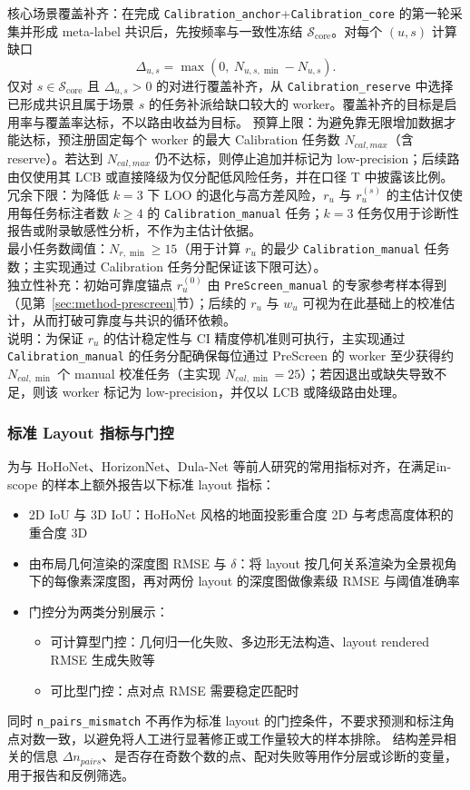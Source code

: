 \noindent 核心场景覆盖补齐：在完成 \texttt{Calibration\_anchor}+\texttt{Calibration\_core} 的第一轮采集并形成 meta-label 共识后，先按频率与一致性冻结 $\mathcal{S}_{\mathrm{core}}$。对每个 $(u,s)$ 计算缺口
\[\Delta_{u,s}=\max\left(0,\ N_{u,s,\min}-N_{u,s}\right).\]
仅对 $s\in\mathcal{S}_{\mathrm{core}}$ 且 $\Delta_{u,s}>0$ 的对进行覆盖补齐，从 \texttt{Calibration\_reserve} 中选择已形成共识且属于场景 $s$ 的任务补派给缺口较大的 worker。覆盖补齐的目标是启用率与覆盖率达标，不以路由收益为目标。
预算上限：为避免靠无限增加数据才能达标，预注册固定每个 worker 的最大 Calibration 任务数 $N_{cal,max}$（含 reserve）。若达到 $N_{cal,max}$ 仍不达标，则停止追加并标记为 low-precision；后续路由仅使用其 LCB 或直接降级为仅分配低风险任务，并在口径 T 中披露该比例。
\\ 冗余下限：为降低 $k=3$ 下 LOO 的退化与高方差风险，$r_u$ 与 $r_u^{\left(s\right)}$ 的主估计仅使用每任务标注者数 $k\geq4$ 的 \texttt{Calibration\_manual} 任务；$k=3$ 任务仅用于诊断性报告或附录敏感性分析，不作为主估计依据。
\\ 最小任务数阈值：$N_{r,\min}\geq 15$（用于计算 $r_u$ 的最少 \texttt{Calibration\_manual} 任务数；主实现通过 Calibration 任务分配保证该下限可达）。
\\ 独立性补充：初始可靠度锚点 $r_u^{\left(0\right)}$ 由 \texttt{PreScreen\_manual} 的专家参考样本得到（见第~\ref{sec:method-prescreen}节）；后续的 $r_u$ 与 $w_u$ 可视为在此基础上的校准估计，从而打破可靠度与共识的循环依赖。
\\ 说明：为保证 $r_u$ 的估计稳定性与 CI 精度停机准则可执行，主实现通过 \texttt{Calibration\_manual} 的任务分配确保每位通过 PreScreen 的 worker 至少获得约 $N_{cal,\min}$ 个 manual 校准任务（主实现 $N_{cal,\min}=25$）；若因退出或缺失导致不足，则该 worker 标记为 low-precision，并仅以 LCB 或降级路由处理。
\subsubsection{标准 Layout 指标与门控}
为与 HoHoNet、HorizonNet、Dula-Net 等前人研究的常用指标对齐，在满足in-scope 的样本上额外报告以下标准 layout 指标：
\begin{itemize}
    \item 2D IoU 与 3D IoU：HoHoNet 风格的地面投影重合度 2D 与考虑高度体积的重合度 3D
    \item 由布局几何渲染的深度图 RMSE 与 $\delta$：将 layout 按几何关系渲染为全景视角下的每像素深度图，再对两份 layout 的深度图做像素级 RMSE 与阈值准确率
    \item 门控分为两类分别展示：
    \begin{itemize}
        \item 可计算型门控：几何归一化失败、多边形无法构造、layout rendered RMSE 生成失败等
        \item 可比型门控：点对点 RMSE 需要稳定匹配时
    \end{itemize}
\end{itemize}
同时 \texttt{n\_pairs\_mismatch} 不再作为标准 layout 的门控条件，不要求预测和标注角点对数一致，以避免将人工进行显著修正或工作量较大的样本排除。
结构差异相关的信息 $\Delta n_{pairs}$、是否存在奇数个数的点、配对失败等用作分层或诊断的变量，用于报告和反例筛选。


